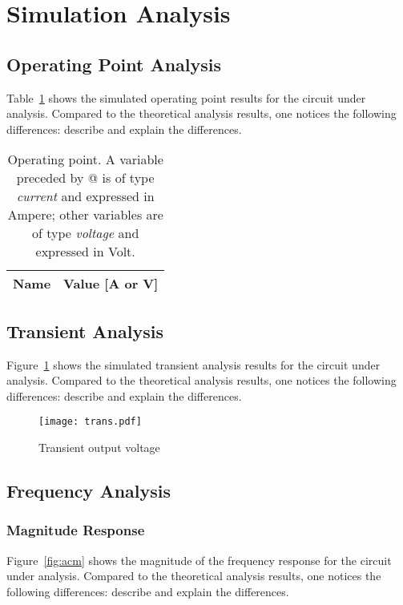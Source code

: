 \section{Simulation Analysis}
\label{sec:simulation}

\subsection{Operating Point Analysis}

Table~\ref{tab:op} shows the simulated operating point results for the circuit under analysis. Compared to the theoretical analysis results, one notices the following differences: describe and explain the differences.

\begin{table}[H]
  \centering
  \begin{tabular}{|l|r|}
    \hline    
    {\bf Name} & {\bf Value [A or V]} \\ \hline
    
  \end{tabular}
  \caption{Operating point. A variable preceded by @ is of type {\em current} and expressed in Ampere; other variables are of type {\it voltage} and expressed in Volt.}
  \label{tab:op}
\end{table}


\subsection{Transient Analysis}

Figure~\ref{fig:trans} shows the simulated transient analysis results for the circuit under analysis. Compared to the theoretical analysis results, one notices the following differences: describe and explain the differences.

\begin{figure}[H] \centering
\texttt{[image: trans.pdf]}
\caption{Transient output voltage}
\label{fig:trans}
\end{figure}


\subsection{Frequency Analysis}

\subsubsection{Magnitude Response}

Figure~\ref{fig:acm} shows the magnitude of the frequency response for the circuit under analysis. Compared to the theoretical analysis results, one notices the following differences: describe and explain the differences.


